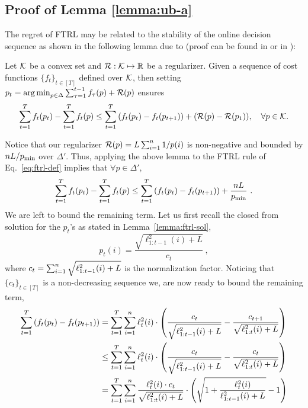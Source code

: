 \subsection{ Proof of Lemma \ref{lemma:ub-a}}
\begin{proofarg}{}
The regret of FTRL may be related to the stability of the online decision sequence as shown in
 the following lemma due to \cite{kalai2005efficient} (proof 
 can be found in \cite{Hazan09}  or in \cite{shalev2012online}):
\begin{lemma} \label{Lemma:FTL-BTL_appendix}
Let $\mathcal{K}$ be a convex set and  $\mathcal{R}:\mathcal{K}\mapsto{\mathbb R}$ be a regularizer. Given a sequence of cost functions $\{f_t \}_{t\in[T]}$ defined over $\mathcal{K}$, then setting $p_t = \operatorname*{arg\,min}_{p\in\Delta}\sum_{\tau=1}^{t-1}f_{\tau}(p)+\mathcal{R}(p)$ 
ensures
\begin{align*}
\sum_{t=1}^T f_t(p_t)-\sum_{t=1}^T f_t(p)\leq \sum_{t=1}^T\left( f_t(p_t) -f_t(p_{t+1}) \right) +(\mathcal{R}(p)-\mathcal{R}(p_1)), \quad \forall p\in\mathcal{K}.
\end{align*}
\end{lemma}
Notice that our regularizer $\mathcal{R}(p) =  L \sum_{i=1}^n {1}/{p(i)}$ is non-negative and bounded by $nL/p_{\text{min}}$ over $\Delta'$. 
Thus, applying the above lemma to the FTRL rule of Eq.~\eqref{eq:ftrl-def} implies that $\forall p\in\Delta'$,
\begin{equation} \label{eq:ftrl-regret}
\sum_{t=1}^T f_t(p_t)   - \sum_{t=1}^T f_t(p)  
\leq  \sum_{t=1}^T \left( f_t(p_t)- f_t(p_{t+1}) \right) +  \frac{nL}{p_{\text{min}}}~.
\end{equation}
We are left to bound the remaining term. Let us first recall the closed from solution for the $p_t$'s as stated in Lemma~\ref{lemma:ftrl-sol},
$$
p_t(i) =\frac{\sqrt{\ell_{1:t-1}^2(i) + L}}{c_t}~,
$$
where $c_t = \sum_{i=1}^n \sqrt{\ell_{1:{t-1}}^2(i) + L} $ is the normalization factor. Noticing that $\{c_t\}_{t\in[T]}$ is a non-decreasing sequence
we, are now ready to bound the remaining term,
\begin{align*}
\sumtt \left(   f_t(p_t) -  f_t(p_{t+1})  \right)  &= \sum_{t=1}^T \sumin \ell_t^2(i) \cdot \left( \frac{c_t }{\sqrt{\ell^2_{1:t-1}(i) +L}  }-\frac{c_{t+1} }{\sqrt{\ell^2_{1:t}(i) +L}  }   \right)\\
&\leq \sum_{t=1}^T \sumin \ell_t^2(i) \cdot \left( \frac{c_t }{\sqrt{\ell^2_{1:t-1}(i) +L}  }-\frac{c_t }{\sqrt{\ell^2_{1:t}(i) +L}  }   \right)\\
&=\sum_{t=1}^T \sumin \frac{\ell_t^2(i)\cdot c_t}{\sqrt{\ell^2_{1:t}(i) +L} } \cdot \left( \sqrt{1+ \frac{\ell_t^2(i)}{\ell^2_{1:t-1}(i) +L} } -1  \right)\\

\end{align*}
\end{proofarg}
